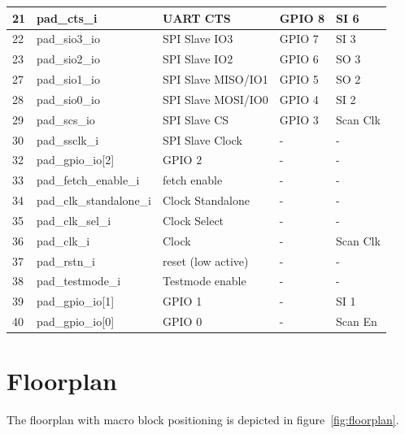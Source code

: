 \begin{table}[htbp]
\begin{tabular}{|l|l|l|l|l|}
  21 & pad\_cts\_i & UART CTS & GPIO 8  & SI 6 \\ \hline
  22 & pad\_sio3\_io & SPI Slave IO3 & GPIO 7  & SI 3 \\ \hline
  23 & pad\_sio2\_io & SPI Slave IO2 & GPIO 6  & SO 3 \\ \hline
  27 & pad\_sio1\_io & SPI Slave MISO/IO1 & GPIO 5  & SO 2 \\ \hline
  28 & pad\_sio0\_io & SPI Slave MOSI/IO0 & GPIO 4  & SI 2 \\ \hline
  29 & pad\_scs\_io & SPI Slave CS & GPIO 3  & Scan Clk \\ \hline
  30 & pad\_ssclk\_i & SPI Slave Clock & -  & - \\ \hline
  32 & pad\_gpio\_io[2] & GPIO 2 & -  & - \\ \hline
  33 & pad\_fetch\_enable\_i & fetch enable & -  & - \\ \hline
  34 & pad\_clk\_standalone\_i & Clock Standalone & -  & - \\ \hline
  35 & pad\_clk\_sel\_i & Clock Select & -  & - \\ \hline
  36 & pad\_clk\_i & Clock & -  & Scan Clk \\ \hline
  37 & pad\_rstn\_i & reset (low active) & -  & - \\ \hline
  38 & pad\_testmode\_i & Testmode enable & -  & - \\ \hline
  39 & pad\_gpio\_io[1] & GPIO 1 & - & SI 1 \\ \hline
  40 & pad\_gpio\_io[0] & GPIO 0 & - & Scan En \\ \hline
\end{tabular}  
\end{table}

\section{Floorplan}

The floorplan with macro block positioning is depicted in figure~\ref{fig:floorplan}.

